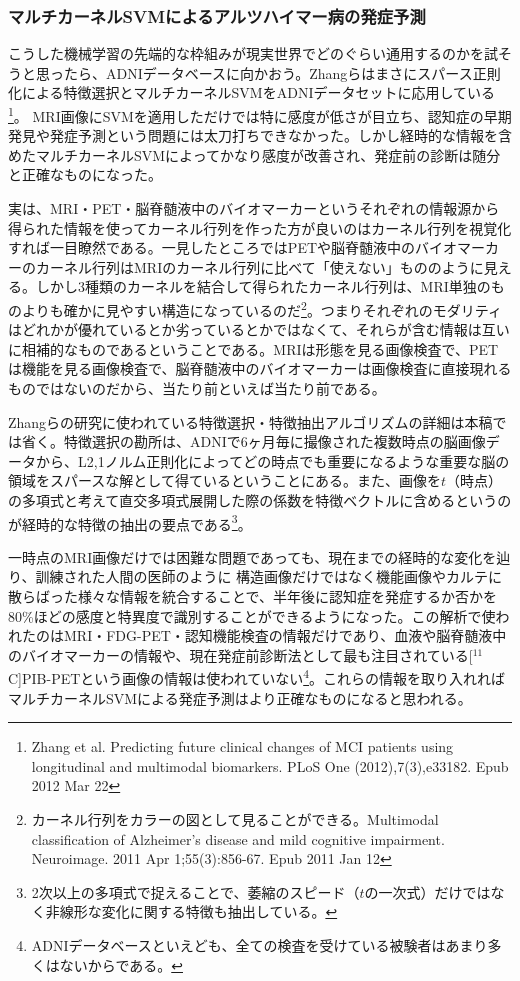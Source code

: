 \subsubsection{マルチカーネルSVMによるアルツハイマー病の発症予測}
こうした機械学習の先端的な枠組みが現実世界でどのぐらい通用するのかを試そうと思ったら、ADNIデータベースに向かおう。Zhangらはまさにスパース正則化による特徴選択とマルチカーネルSVMをADNIデータセットに応用している
\footnote{Zhang et al. Predicting future clinical changes of MCI patients using longitudinal and multimodal biomarkers. PLoS One (2012),7(3),e33182. Epub 2012 Mar 22}。
MRI画像にSVMを適用しただけでは特に感度が低さが目立ち、認知症の早期発見や発症予測という問題には太刀打ちできなかった。しかし経時的な情報を含めたマルチカーネルSVMによってかなり感度が改善され、発症前の診断は随分と正確なものになった。

実は、MRI・PET・脳脊髄液中のバイオマーカーというそれぞれの情報源から得られた情報を使ってカーネル行列を作った方が良いのはカーネル行列を視覚化すれば一目瞭然である。一見したところではPETや脳脊髄液中のバイオマーカーのカーネル行列はMRIのカーネル行列に比べて「使えない」もののように見える。しかし3種類のカーネルを結合して得られたカーネル行列は、MRI単独のものよりも確かに見やすい構造になっているのだ\footnote{カーネル行列をカラーの図として見ることができる。Multimodal classification of Alzheimer's disease and mild cognitive impairment. Neuroimage. 2011 Apr 1;55(3):856-67. Epub 2011 Jan 12}。つまりそれぞれのモダリティはどれかが優れているとか劣っているとかではなくて、それらが含む情報は互いに相補的なものであるということである。MRIは形態を見る画像検査で、PETは機能を見る画像検査で、脳脊髄液中のバイオマーカーは画像検査に直接現れるものではないのだから、当たり前といえば当たり前である。

Zhangらの研究に使われている特徴選択・特徴抽出アルゴリズムの詳細は本稿では省く。特徴選択の勘所は、ADNIで6ヶ月毎に撮像された複数時点の脳画像データから、L2,1ノルム正則化によってどの時点でも重要になるような重要な脳の領域をスパースな解として得ているということにある。また、画像を$t$（時点）の多項式と考えて直交多項式展開した際の係数を特徴ベクトルに含めるというのが経時的な特徴の抽出の要点である\footnote{2次以上の多項式で捉えることで、萎縮のスピード（$t$の一次式）だけではなく非線形な変化に関する特徴も抽出している。}。

一時点のMRI画像だけでは困難な問題であっても、現在までの経時的な変化を辿り、訓練された人間の医師のように
構造画像だけではなく機能画像やカルテに散らばった様々な情報を統合することで、半年後に認知症を発症するか否かを80\%ほどの感度と特異度で識別することができるようになった。この解析で使われたのはMRI・FDG-PET・認知機能検査の情報だけであり、血液や脳脊髄液中のバイオマーカーの情報や、現在発症前診断法として最も注目されている[$^{11}$C]PIB-PETという画像の情報は使われていない\footnote{ADNIデータベースといえども、全ての検査を受けている被験者はあまり多くはないからである。}。これらの情報を取り入れればマルチカーネルSVMによる発症予測はより正確なものになると思われる。

